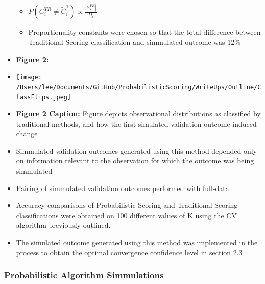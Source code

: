 \documentclass[12pt,]{article}
\providecommand{\tightlist}{%
  \setlength{\itemsep}{0pt}\setlength{\parskip}{0pt}}
\begin{document}
\begin{itemize}
  \begin{itemize}
  \tightlist
  \item
    \(P\left(C_{i}^{TR} \neq \tilde{C}_{i}^{1} \right) \propto \frac{|\mathbb{S}^{PR}_{T}|}{D_{i}}\)
  \item
    Proportionality constants were chosen so that the total difference
    between Traditional Scoring classification and simmulated outcome
    was 12\%
  \end{itemize}
\item
  \textbf{Figure 2:}
\item
  \texttt{[image: /Users/lee/Documents/GitHub/ProbabilisticScoring/WriteUps/Outline/ClassFlips.jpeg]}
\item
  \textbf{Figure 2 Caption:} Figure depicts observational distributions
  as classified by traditional methods, and how the first simulated
  validation outcome induced change
\item
  Simmulated validation outcomes generated using this method depended
  only on information relevant to the observation for which the outcome
  was being simmulated
\item
  Pairing of simmulated validation outcomes performed with full-data
\item
  Accuracy comparisons of Probabilistic Scoring and Traditional Scoring
  classifications were obtained on 100 different values of K using the
  CV algorithm previously outlined.
\item
  The simulated outcome generated using this method was implemented in
  the process to obtain the optimal convergence confidence level in
  section 2.3
\end{itemize}

\hypertarget{probabilistic-algorithm-simmulations}{%
\subsubsection{Probabilistic Algorithm
Simmulations}\label{probabilistic-algorithm-simmulations}}
\end{document}
